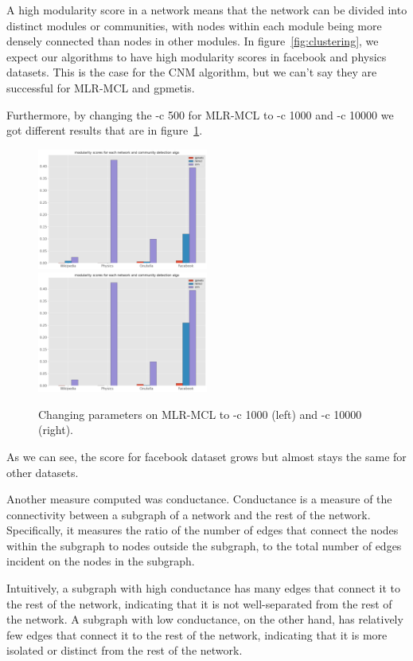 \documentclass[letterpaper, 11pt]{article}
\newcommand{\1}{\mathds{1}}	%
\theoremstyle{definition}
\begin{document}
A high modularity score in a network means that the network can be divided into distinct modules or communities, with nodes within each module being more densely connected than nodes in other modules. In figure~\ref{fig:clustering}, we expect our algorithms to have high modularity scores in facebook and physics datasets. This is the case for the CNM algorithm, but we can't say they are successful for MLR-MCL and gpmetis.

Furthermore, by changing the -c 500 for MLR-MCL to -c 1000 and -c 10000 we got different results that are in figure~\ref{fig:c}.
\begin{figure}[h]
\includegraphics[width=0.5\textwidth]{output1000.png}
\includegraphics[width=0.5\textwidth]{output10000.png}
\captionsetup{justification=centering,margin=0.5cm}
\caption{Changing parameters on MLR-MCL to -c 1000 (left) and -c 10000 (right).}
\label{fig:c}
\end{figure}

As we can see, the score for facebook dataset grows but almost stays the same for other datasets.

Another measure computed was conductance. Conductance is a measure of the connectivity between a subgraph of a network and the rest of the network. Specifically, it measures the ratio of the number of edges that connect the nodes within the subgraph to nodes outside the subgraph, to the total number of edges incident on the nodes in the subgraph.

Intuitively, a subgraph with high conductance has many edges that connect it to the rest of the network, indicating that it is not well-separated from the rest of the network. A subgraph with low conductance, on the other hand, has relatively few edges that connect it to the rest of the network, indicating that it is more isolated or distinct from the rest of the network.
\end{document}
